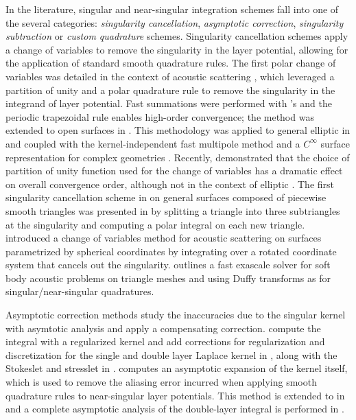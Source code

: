 In the \bie literature, singular and near-singular integration schemes fall into one of the several categories: \textit{singularity cancellation},  \textit{asymptotic correction}, \textit{singularity subtraction} or \textit{custom quadrature} schemes.
Singularity cancellation schemes apply a change of variables to remove the singularity in the layer potential, allowing for the application of standard smooth quadrature rules. 
The first polar change of variables was detailed in the context of acoustic scattering \cite{bruno2001fast}, which leveraged a partition of unity and a polar quadrature rule to remove the singularity in the integrand of layer potential.
Fast summations were performed with \fft's and the periodic trapezoidal rule enables high-order convergence; the method was extended to open surfaces in \cite{bruno2013high}.
This methodology was applied to general elliptic \pdes in \cite{YBZ} and coupled with the kernel-independent fast multipole method \cite{ying2004kernel} and a $C^\infty$ surface representation for complex geometries \cite{ying2004simple}.
Recently, \cite{malhotra2019taylor} demonstrated that the choice of partition of unity function used for the change of variables has a dramatic effect on overall convergence order, although not in the context of elliptic \pdes.
The first singularity cancellation scheme in \threed on general surfaces composed of piecewise smooth triangles was presented in \cite{bremer2012nystrom,bremer2013numerical} by splitting a triangle into three subtriangles at the singularity and computing a polar integral on each new triangle.
\cite{ganesh2004high} introduced a change of variables method for acoustic scattering on \threed surfaces parametrized by spherical coordinates by integrating over a rotated coordinate system that cancels out the singularity.
\cite{abduljabbar2019extreme} outlines a fast exascale solver for soft body acoustic problems on triangle meshes \threed and using Duffy transforms as for singular/near-singular quadratures.

Asymptotic correction methods study the inaccuracies due to the singular \pde kernel with asymtotic analysis and apply a compensating correction. %
\cite{beale2004grid,beale2016simple,tlupova2019regularized} compute the integral with a regularized kernel and add corrections for regularization and discretization for the single and double layer Laplace kernel in \threed, along with the Stokeslet and stresslet in \threed.
\cite{carvalho2018asymptotic1} computes an asymptotic expansion of the kernel itself, which is used to remove the aliasing error incurred when applying smooth quadrature rules to near-singular layer potentials. 
This method is extended to \threed in \cite{carvalho2018asymptotic} and a complete asymptotic analysis of the double-layer integral is performed in \cite{khatri2020close}.

